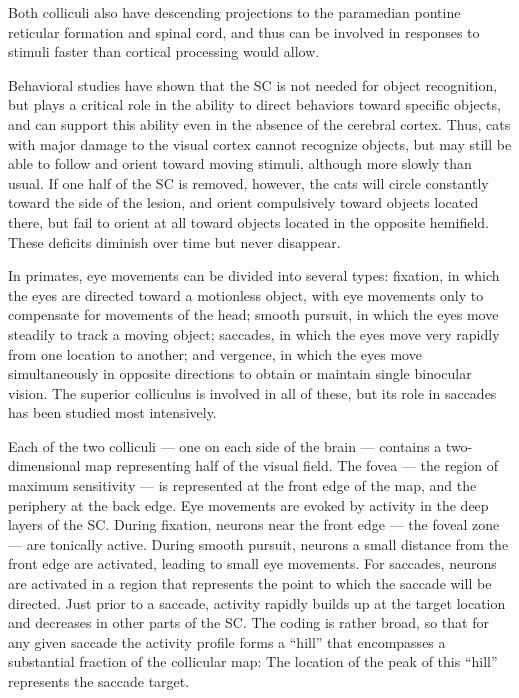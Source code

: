 Both colliculi also have descending projections to the paramedian pontine reticular formation and spinal cord, and thus can be involved in responses to stimuli faster than cortical processing would allow.

Behavioral studies have shown that the SC is not needed for object recognition, but plays a critical role in the ability to direct behaviors toward specific objects, and can support this ability even in the absence of the cerebral cortex. Thus, cats with major damage to the visual cortex cannot recognize objects, but may still be able to follow and orient toward moving stimuli, although more slowly than usual. If one half of the SC is removed, however, the cats will circle constantly toward the side of the lesion, and orient compulsively toward objects located there, but fail to orient at all toward objects located in the opposite hemifield. These deficits diminish over time but never disappear.

In primates, eye movements can be divided into several types: fixation, in which the eyes are directed toward a motionless object, with eye movements only to compensate for movements of the head; smooth pursuit, in which the eyes move steadily to track a moving object; saccades, in which the eyes move very rapidly from one location to another; and vergence, in which the eyes move simultaneously in opposite directions to obtain or maintain single binocular vision. The superior colliculus is involved in all of these, but its role in saccades has been studied most intensively.

Each of the two colliculi --- one on each side of the brain --- contains a two-dimensional map representing half of the visual field. The fovea --- the region of maximum sensitivity --- is represented at the front edge of the map, and the periphery at the back edge. Eye movements are evoked by activity in the deep layers of the SC. During fixation, neurons near the front edge --- the foveal zone --- are tonically active. During smooth pursuit, neurons a small distance from the front edge are activated, leading to small eye movements. For saccades, neurons are activated in a region that represents the point to which the saccade will be directed. Just prior to a saccade, activity rapidly builds up at the target location and decreases in other parts of the SC. The coding is rather broad, so that for any given saccade the activity profile forms a ``hill'' that encompasses a substantial fraction of the collicular map: The location of the peak of this ``hill'' represents the saccade target.

